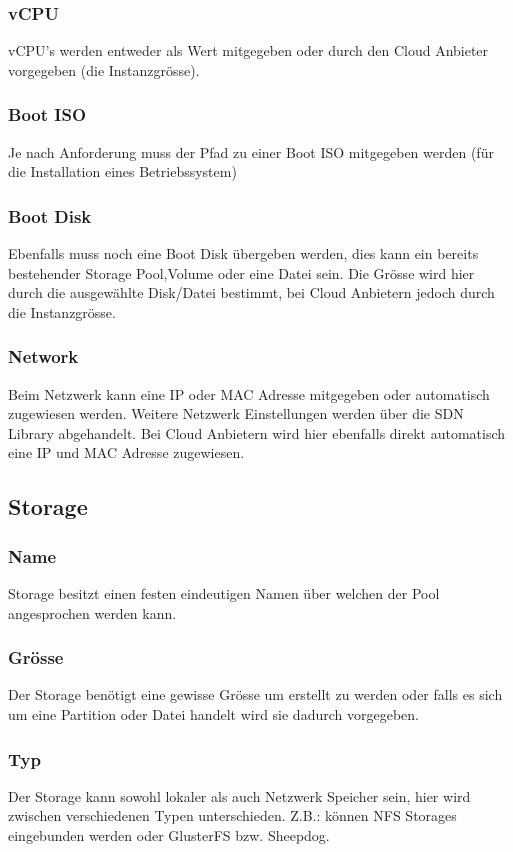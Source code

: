\documentclass[11pt]{scrartcl}
\begin{document}
\subsubsection{vCPU}
vCPU's werden entweder als Wert mitgegeben oder durch den Cloud Anbieter vorgegeben (die Instanzgrösse). 

\subsubsection{Boot ISO}
Je nach Anforderung muss der Pfad zu einer Boot ISO mitgegeben werden (für die Installation eines 
Betriebssystem) 

\subsubsection{Boot Disk}
Ebenfalls muss noch eine Boot Disk übergeben werden, dies kann ein bereits 
bestehender Storage Pool,Volume oder eine Datei sein.
Die Grösse wird hier durch die ausgewählte Disk/Datei bestimmt, bei Cloud 
Anbietern jedoch durch die Instanzgrösse.

\subsubsection{Network}
Beim Netzwerk kann eine IP oder MAC Adresse mitgegeben oder automatisch zugewiesen 
werden.
Weitere Netzwerk Einstellungen werden über die SDN Library abgehandelt.
Bei Cloud Anbietern wird hier ebenfalls direkt automatisch eine IP und MAC 
Adresse zugewiesen.

\subsection{Storage}
\subsubsection{Name}
Storage besitzt einen festen eindeutigen Namen über welchen der Pool angesprochen 
werden kann.
\subsubsection{Grösse}
Der Storage benötigt eine gewisse Grösse um erstellt zu werden oder falls es 
sich um eine Partition oder Datei handelt wird sie dadurch vorgegeben.

\subsubsection{Typ}
Der Storage kann sowohl lokaler als auch Netzwerk Speicher sein, hier wird 
zwischen verschiedenen Typen unterschieden.
Z.B.: können NFS Storages eingebunden werden oder GlusterFS bzw. Sheepdog.
\end{document}
